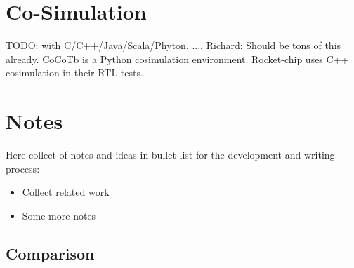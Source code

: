 \documentclass[a4paper, conference]{IEEEtran}
\newcommand{\todo}[1]{{\color{olive} TODO: #1}}
\newcommand{\ducky}[1]{{\color{orange} Richard: #1}}
\begin{document}
\section{Co-Simulation}

\todo{with C/C++/Java/Scala/Phyton, ....}
\ducky{Should be tons of this already. CoCoTb is a Python cosimulation environment. Rocket-chip uses C++ cosimulation in their RTL tests.}


\section{Notes}

Here collect of notes and ideas in bullet list for the development and writing process:

\begin{itemize}
\item Collect related work
\item Some more notes
\end{itemize}

\subsection{Comparison}
\end{document}
